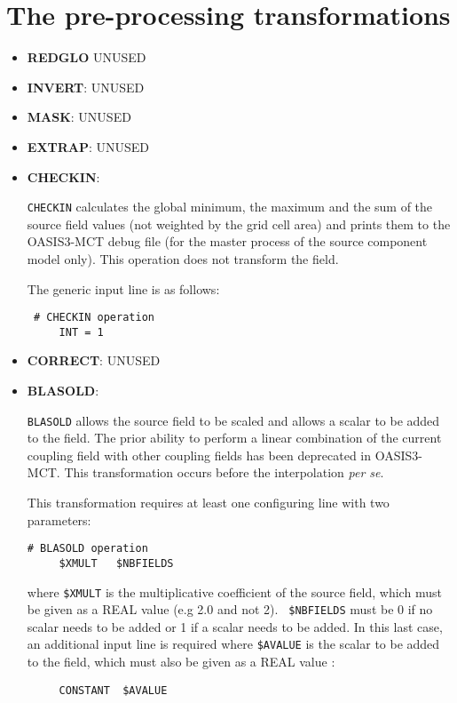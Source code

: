 \section{The pre-processing transformations}
\label{subsec_preproc}

\begin{itemize}

\item {\bf REDGLO} UNUSED

\item {\bf INVERT}: UNUSED

\item {\bf MASK}: UNUSED
 
\item {\bf EXTRAP}: UNUSED

\item {\bf CHECKIN}:

  {\tt CHECKIN} calculates the global minimum, the maximum and the sum
  of the source field values (not weighted by the grid cell area) and
  prints them to the OASIS3-MCT debug file (for the master process of
  the source component model only). This operation does not transform
  the field.

  The generic input line is as follows:
 \begin{verbatim}
 # CHECKIN operation
     INT = 1  
\end{verbatim} 

\item {\bf CORRECT}: UNUSED

\item {\bf BLASOLD}:

  {\tt BLASOLD} allows the source field to be scaled and allows a
  scalar to be added to the field.  The prior ability to perform a
  linear combination of the current coupling field with other coupling
  fields has been deprecated in OASIS3-MCT.  This transformation
  occurs before the interpolation {\it per se}.

  This transformation requires at least one configuring line with two
  parameters:
 \begin{verbatim}
# BLASOLD operation
     $XMULT   $NBFIELDS 
\end{verbatim}
  where {\tt \$XMULT} is the multiplicative coefficient of the source
  field, which must be given as a REAL value (e.g 2.0 and not 2). {\tt
    \$NBFIELDS} must be 0 if no scalar needs to be added or 1 if a
  scalar needs to be added. In this last case, an additional input
  line is required where {\tt \$AVALUE} is the scalar to be added to
  the field, which must also be given as a REAL value :
\begin{verbatim}
     CONSTANT  $AVALUE
\end{verbatim} 
\end{itemize}

